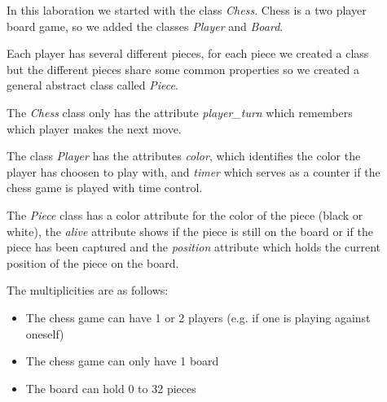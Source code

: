 \documentclass[11pt,a4paper]{article}
\begin{document}
\begin{description}
    \item[]
    In this laboration we started with the class \emph{Chess}.
    Chess is a two player board game, so we added the 
    classes \emph{Player} and \emph{Board}.
    \item[]
    Each player has several different pieces, for each piece we created a class
    but the different pieces share some common properties so we created a general abstract class
    called \emph{Piece}. 
    \item[]
    The \emph{Chess} class only has the attribute \emph{player\_turn} which 
    remembers which player makes the next move.
    \item[]
    The class \emph{Player} has the attributes \emph{color}, which identifies
    the color the player has choosen to play with, and \emph{timer} which serves as a
    counter if the chess game is played with time control.
    \item[]
    The \emph{Piece} class has a color attribute for the color of the piece (black or white),
    the \emph{alive} attribute shows if the piece is still on the board or if the piece
    has been captured and the \emph{position} attribute which holds the current position of
    the piece on the board.
    \item[]
        The multiplicities are as follows:
        \begin{itemize}
            \item The chess game can have 1 or 2 players (e.g. if one is playing against oneself)
            \item The chess game can only have 1 board
            \item The board can hold 0 to 32 pieces
        \end{itemize}
\end{description}
\end{document}
